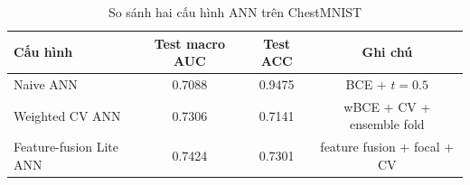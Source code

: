 \begin{table}[H]
\centering
\caption{So sánh hai cấu hình ANN trên ChestMNIST}
\label{tab:chestmnist-model-comparison}
\begin{tabular}{l c c c}
\toprule
Cấu hình & Test macro AUC & Test ACC & Ghi chú \\
\midrule
Naive ANN & 0.7088 & 0.9475 & BCE + $t=0.5$ \\
Weighted CV ANN & 0.7306 & 0.7141 & wBCE + CV + ensemble fold \\
Feature-fusion Lite ANN & 0.7424 & 0.7301 & feature fusion + focal + CV \\
\bottomrule
\end{tabular}
\end{table}
